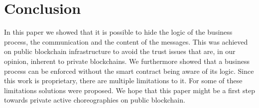 \documentclass[runningheads]{llncs}
\newcommand{\comment}[1]{}
\newcommand{\refsec}[1]{Section~\ref{#1}}
\newcommand{\quotel}{``}
\newcommand{\quoter}{''}
\begin{document}
\comment{
We would also like to mention parity ethereum. With parity, users are able to hide private contracts in public contracts  and to exchange private messages. However for private contract execution parity is relying on validators, \quotel account[s] that can allow a private contract's state change\quoter  \cite{parity}. In our understanding this makes parity unfit for for untrusted business process execution, since, like private blockchains, it requires trust in one or multiple nodes.

\todo{parity comparison}
}
\section{Conclusion} \label{sec:conclusion}

\comment{
\begin{itemize}
    \item How could mentioned in \refsec{subsec:technologies} improve \refsec{sec:eval}?
    \item How did it work out in the end? 
\end{itemize}}

In this paper we showed that it is possible to hide the logic of the business process, the communication and the content of the messages. This was achieved on public blockchain infrastructure to avoid the trust issues that are, in our opinion, inherent to private blockchains. We furthermore showed that a business process can be enforced without the smart contract being aware of its logic. Since this work is proprietary, there are multiple limitations to it. For some of these limitations solutions were proposed. We hope that this paper might be a first step towards private active choreographies on public blockchain.





\end{document}
